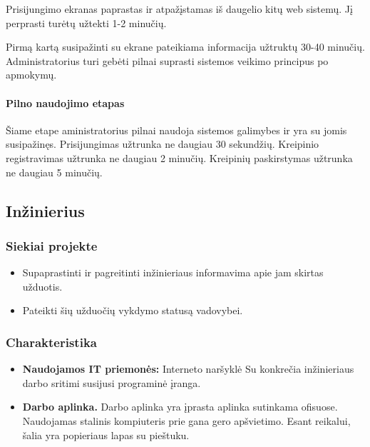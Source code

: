 			Prisijungimo ekranas paprastas ir atpažįstamas iš daugelio kitų web sistemų.
			Jį perprasti turėtų užtekti 1-2 minučių.

			Pirmą kartą susipažinti su ekrane pateikiama informacija užtruktų 30-40 minučių.
			Administratorius turi gebėti pilnai suprasti sistemos veikimo principus po apmokymų.
			
			
			\setcounter{tocdepth}{5} \setcounter{secnumdepth}{5}
			
			\paragraph{Pilno naudojimo etapas}
			
			Šiame etape aministratorius pilnai naudoja sistemos galimybes ir yra su jomis susipažinęs.
			Prisijungimas užtrunka ne daugiau 30 sekundžių. Kreipinio registravimas užtrunka ne daugiau 2 minučių.
			Kreipinių paskirstymas užtrunka ne daugiau 5 minučių.
			
			
	\subsection{Inžinierius}
	
		\subsubsection{Siekiai projekte}
	
		\begin{itemize}
			\item Supaprastinti ir pagreitinti inžinieriaus informavima apie jam skirtas užduotis.
			\item Pateikti šių užduočių vykdymo statusą vadovybei.
		\end{itemize}
		
		
		\subsubsection{Charakteristika}
		
		\begin{itemize}
			\item \textbf{Naudojamos IT priemonės:}
				\subitem Interneto naršyklė
				\subitem Su konkrečia inžinieriaus darbo sritimi susijusi programinė įranga.
			\item \textbf{Darbo aplinka.}
			Darbo aplinka yra įprasta aplinka sutinkama ofisuose.
			Naudojamas stalinis kompiuteris prie gana gero apšvietimo.
			Esant reikalui, šalia yra popieriaus lapas su pieštuku.
		\end{itemize}

